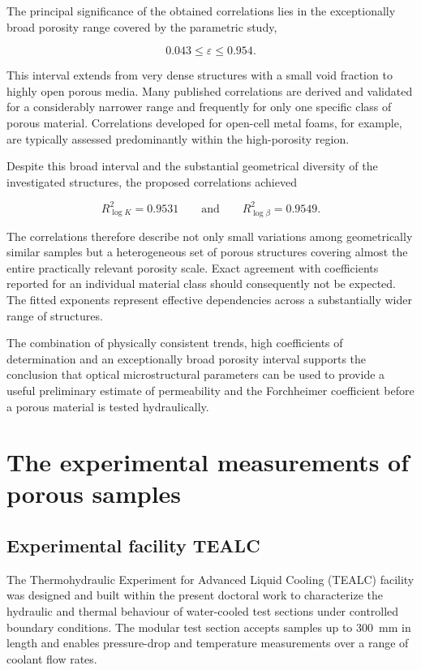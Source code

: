 \documentclass[a4paper]{article}
\begin{document}
The principal significance of the obtained correlations lies in the
exceptionally broad porosity range covered by the parametric study,

\begin{equation}
0.043
\leq
\varepsilon
\leq
0.954.
\label{eq:parametric_porosity_range}
\end{equation}

This interval extends from very dense structures with a small void fraction to
highly open porous media. Many published correlations are derived and
validated for a considerably narrower range and frequently for only one
specific class of porous material. Correlations developed for open-cell metal
foams, for example, are typically assessed predominantly within the
high-porosity region.

Despite this broad interval and the substantial geometrical diversity of the
investigated structures, the proposed correlations achieved

\begin{equation}
R^{2}_{\log K}
=
0.9531
\qquad\text{and}\qquad
R^{2}_{\log\beta}
=
0.9549.
\end{equation}

The correlations therefore describe not only small variations among
geometrically similar samples but a heterogeneous set of porous structures
covering almost the entire practically relevant porosity scale. Exact
agreement with coefficients reported for an individual material class should
consequently not be expected. The fitted exponents represent effective
dependencies across a substantially wider range of structures.

The combination of physically consistent trends, high coefficients of
determination and an exceptionally broad porosity interval supports the
conclusion that optical microstructural parameters can be used to provide a
useful preliminary estimate of permeability and the Forchheimer coefficient
before a porous material is tested hydraulically.


\newpage
\section{The experimental measurements of porous samples}

\subsection{Experimental facility TEALC}
The Thermohydraulic Experiment for Advanced Liquid Cooling (TEALC) facility was designed and built within the present doctoral work to characterize the hydraulic and thermal behaviour of water-cooled test sections under controlled boundary conditions. The modular test section accepts samples up to 300~mm in length and enables pressure-drop and temperature measurements over a range of coolant flow rates.
\end{document}
